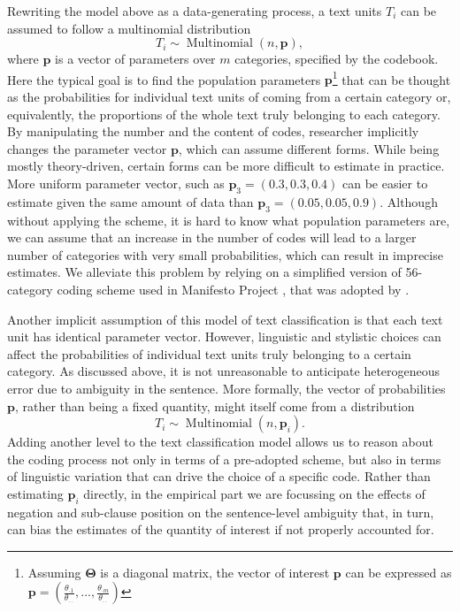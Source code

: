 \documentclass[a4paper, 12pt]{article}
\begin{document}
Rewriting the model above as a data-generating process, a text units $T_i$ can be assumed to follow a multinomial distribution
\begin{equation*}
  T_i \sim \operatorname{Multinomial}(n, \bm{p}),
\end{equation*}
where $\bm{p}$ is a vector of parameters over $m$ categories, specified by the codebook. Here the typical goal is to find the population parameters $\bm{p}$\footnote{Assuming $\bm{\Theta}$ is a diagonal matrix, the vector of interest $\bm{p}$ can be expressed as $\bm{p} = (\frac{\theta_{\cdot 1}}{\theta_{\cdot\cdot}}, ..., \frac{\theta_{\cdot m}}{\theta_{\cdot\cdot}})$} that can be thought as the probabilities for individual text units of coming from a certain category or, equivalently, the proportions of the whole text truly belonging to each category. By manipulating the number and the content of codes, researcher implicitly changes the parameter vector $\bm{p}$, which can assume different forms. While being mostly theory-driven, certain forms can be more difficult to estimate in practice. More uniform parameter vector, such as $\bm{p}_3 = (0.3, 0.3, 0.4)$ can be easier to estimate given the same amount of data than $\bm{p}_3 = (0.05, 0.05, 0.9)$. Although without applying the scheme, it is hard to know what population parameters are, we can assume that an increase in the number of codes will lead to a larger number of categories with very small probabilities, which can result in imprecise estimates. We alleviate this problem by relying on a simplified version of 56-category coding scheme used in Manifesto Project \citep{Volkens2013}, that was adopted by \citet{Benoit2016}.

Another implicit assumption of this model of text classification is that each text unit has identical parameter vector. However, linguistic and stylistic choices can affect the probabilities of individual text units truly belonging to a certain category. As discussed above, it is not unreasonable to anticipate heterogeneous error due to ambiguity in the sentence. More formally, the vector of probabilities $\bm{p}$, rather than being a fixed quantity, might itself come from a distribution
\begin{equation*}
  T_i \sim \operatorname{Multinomial}(n, \bm{p}_i).
\end{equation*}
Adding another level to the text classification model allows us to reason about the coding process not only in terms of a pre-adopted scheme, but also in terms of linguistic variation that can drive the choice of a specific code. Rather than estimating $\bm{p}_i$ directly, in the empirical part we are focussing on the effects of negation and sub-clause position on the sentence-level ambiguity that, in turn, can bias the estimates of the quantity of interest if not properly accounted for.
\end{document}
